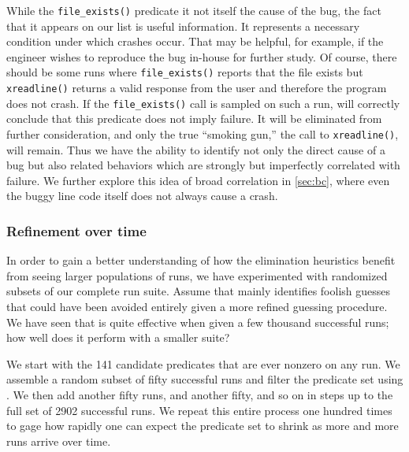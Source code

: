While the \texttt{file\_exists()} predicate it not itself the cause of
the bug, the fact that it appears on our list is useful information.
It represents a necessary condition under which crashes occur.  That
may be helpful, for example, if the engineer wishes to reproduce the
bug in-house for further study.  Of course, there should be some runs
where \texttt{file\_exists()} reports that the file exists but
\texttt{xreadline()} returns a valid response from the user and
therefore the program does not crash.  If the \texttt{file\_exists()}
call is sampled on such a run,  will correctly conclude that this predicate does not
imply failure.  It will be eliminated from further consideration, and
only the true ``smoking gun,'' the call to \texttt{xreadline()}, will
remain.    Thus we have the ability to identify
not only the direct cause of a bug but also related behaviors which
are strongly but imperfectly correlated with failure.  We further
explore this idea of broad correlation in \autoref{sec:bc}, where even
the buggy line code itself does not always cause a crash.

\subsubsection{Refinement over time}

In order to gain a better understanding of how the elimination
heuristics benefit from seeing larger populations of runs, we have
experimented with randomized subsets of our complete run suite.
Assume that  mainly
identifies foolish guesses that could have been avoided entirely given
a more refined guessing procedure.  We have seen that
 is quite effective
when given a few thousand successful runs; how well does it perform
with a smaller suite?

We start with the 141 candidate predicates that are ever nonzero on
any run.  We assemble a random subset of fifty successful runs and
filter the predicate set using .  We then add another fifty runs, and another fifty,
and so on in steps up to the full set of 2902 successful runs.  We
repeat this entire process one hundred times to gage how rapidly one
can expect the predicate set to shrink as more and more runs arrive
over time.

